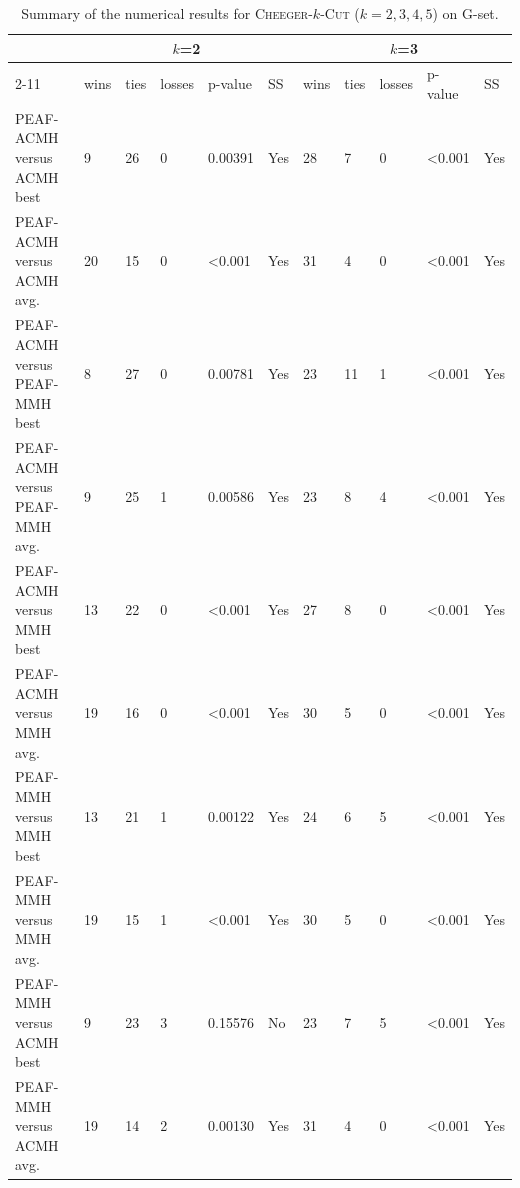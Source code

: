 \documentclass[12pt, a4paper]{article}%
\renewcommand{\arraystretch}{1.3}
\numberwithin{equation}{section}
\theoremstyle{plain}
\begin{document}
			{
				\scriptsize
				\setlength{\tabcolsep}{10pt}
				\renewcommand{\arraystretch}{1.6}
				\begin{landscape}
					\begin{longtable}{|l|lllll|lllll|}
						\caption[Summary for \textsc{Cheeger}-$k$-\textsc{Cut}]{Summary of the numerical results for \textsc{Cheeger}-$k$-\textsc{Cut} ($k=2,3,4,5$) on G-set.}
						\label{tab::cheeger-summary}\\
						\hline
						\multicolumn{1}{|c|}{\multirow{2}{*}{}} & \multicolumn{5}{c|}{$k$=2}                    & \multicolumn{5}{c|}{$k$=3}                    \\ \cline{2-11} 
						\multicolumn{1}{|c|}{}                  & wins & ties & losses & p-value          & SS  & wins & ties & losses & p-value          & SS  \\ \hline
						PEAF-ACMH versus ACMH best             & 9    & 26   & 0      & 0.00391          & Yes & 28   & 7    & 0      & \textless{}0.001 & Yes \\
						PEAF-ACMH versus ACMH avg.             & 20   & 15   & 0      & \textless{}0.001 & Yes & 31   & 4    & 0      & \textless{}0.001 & Yes \\
						PEAF-ACMH versus PEAF-MMH best           & 8    & 27   & 0      & 0.00781          & Yes & 23   & 11   & 1      & \textless{}0.001 & Yes \\
						PEAF-ACMH versus PEAF-MMH avg.           & 9    & 25   & 1      & 0.00586          & Yes & 23   & 8    & 4      & \textless{}0.001 & Yes \\
						PEAF-ACMH versus MMH best               & 13   & 22   & 0      & \textless{}0.001 & Yes & 27   & 8    & 0      & \textless{}0.001 & Yes \\
						PEAF-ACMH versus MMH avg.               & 19   & 16   & 0      & \textless{}0.001 & Yes & 30   & 5    & 0      & \textless{}0.001 & Yes \\
						PEAF-MMH versus MMH best                 & 13   & 21   & 1      & 0.00122          & Yes & 24   & 6    & 5      & \textless{}0.001 & Yes \\
						PEAF-MMH versus MMH avg.                 & 19   & 15   & 1      & \textless{}0.001 & Yes & 30   & 5    & 0      & \textless{}0.001 & Yes \\
						PEAF-MMH versus ACMH best               & 9    & 23   & 3      & 0.15576          & No  & 23   & 7    & 5      & \textless{}0.001 & Yes \\
						PEAF-MMH versus ACMH avg.               & 19   & 14   & 2      & 0.00130          & Yes & 31   & 4    & 0      & \textless{}0.001 & Yes \\

\end{longtable}
\end{landscape}}
\end{document}
